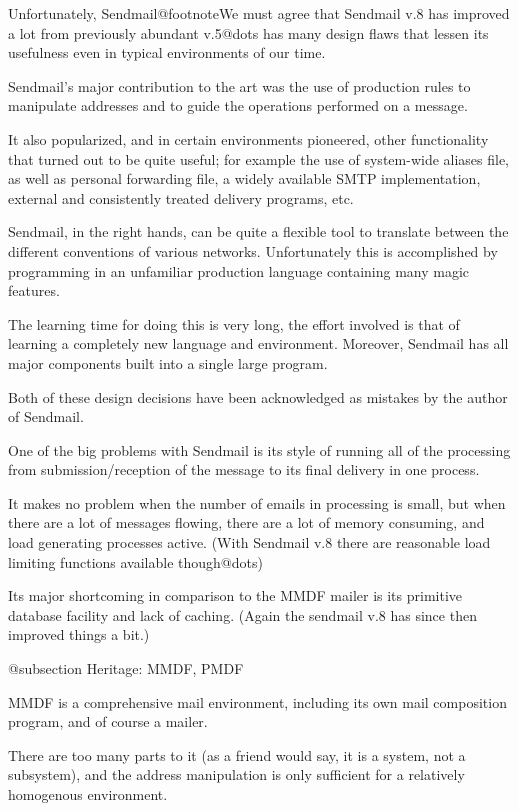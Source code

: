 Unfortunately, Sendmail@footnote{We must agree that Sendmail v.8
has improved a lot from previously abundant v.5@dots{}} has many
design flaws that lessen its usefulness even in typical environments
of our time.

Sendmail's major contribution to the art was the use of production
rules to manipulate addresses and to guide the operations performed
on a message.

It also popularized, and in certain environments pioneered, other
functionality that turned out to be quite useful; for example the
use of system-wide aliases file, as well as personal forwarding file,
a widely available SMTP implementation, external and consistently
treated delivery programs, etc.

Sendmail, in the right hands, can be quite a flexible tool to
translate between the different conventions of various networks.
Unfortunately this is accomplished by programming in an unfamiliar
production language containing many magic features.

The learning time for doing this is very long, the effort involved
is that of learning a completely new language and environment.
Moreover, Sendmail has all major components built into a single
large program.

Both of these design decisions have been acknowledged as mistakes
by the author of Sendmail.

One of the big problems with Sendmail is its style of running all of
the processing from submission/reception of the message to its final
delivery in one process.

It makes no problem when the number of emails in processing is
small, but when there are a lot of messages flowing, there are
a lot of memory consuming, and load generating processes active.
(With Sendmail v.8 there are reasonable load limiting functions
 available though@dots{})

Its major shortcoming in comparison to the MMDF mailer is its
primitive database facility and lack of caching.
(Again the sendmail v.8 has since then improved things a bit.)


@subsection Heritage: MMDF, PMDF

MMDF is a comprehensive mail environment, including its own mail
composition program, and of course a mailer.

There are too many parts to it (as a friend would say,
it is a system, not a subsystem), and the address manipulation
is only sufficient for a relatively homogenous environment.

